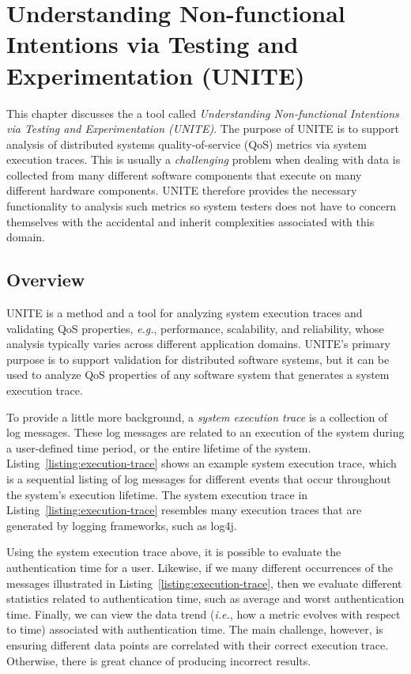 
\chapter{Understanding Non-functional Intentions via Testing and Experimentation (UNITE)}
\label{chap:unite}

This chapter discusses the a tool called \textit{Understanding 
Non-functional Intentions via Testing and Experimentation (UNITE)}.
The purpose of UNITE is to support analysis of distributed
systems quality-of-service (QoS) metrics via system execution 
traces. This is usually a \textit{challenging} problem when
dealing with data is collected from many different software
components that execute on many different hardware components.
UNITE therefore provides the necessary functionality to 
analysis such metrics so system testers does not have to 
concern themselves with the accidental and inherit complexities
associated with this domain.

\section{Overview}
\label{sec:unite-overview}

UNITE is a method and a tool for analyzing system execution 
traces and validating QoS properties, \textit{e.g.}, performance, 
scalability, and reliability, whose analysis typically varies 
across different application domains. UNITE's primary purpose
is to support validation for distributed software systems,
but it can be used to analyze QoS properties of any software
system that generates a system execution trace. 

To provide a little more background, a \textit{system execution 
 trace} is a collection of log messages. These log messages are 
related to an execution of the system during a user-defined time 
period, or the entire lifetime of the system. 
Listing~\ref{listing:execution-trace} shows an example system
execution trace, which is a sequential listing of 
log messages for different events that occur throughout the
system's execution lifetime. The system execution trace in
Listing~\ref{listing:execution-trace} resembles many execution
traces that are generated by logging frameworks, such as log4j.


Using the system execution trace above, it is possible to 
evaluate the authentication time for a user. Likewise, if
we many different occurrences of the messages illustrated 
in Listing~\ref{listing:execution-trace}, then we evaluate
different statistics related to authentication time, such
as average and worst authentication time. Finally, we can
view the data trend (\textit{i.e.}, how a metric evolves
with respect to time) associated with authentication time.
The main challenge, however, is ensuring different data 
points are correlated with their correct execution trace.
Otherwise, there is great chance of producing incorrect
results.

